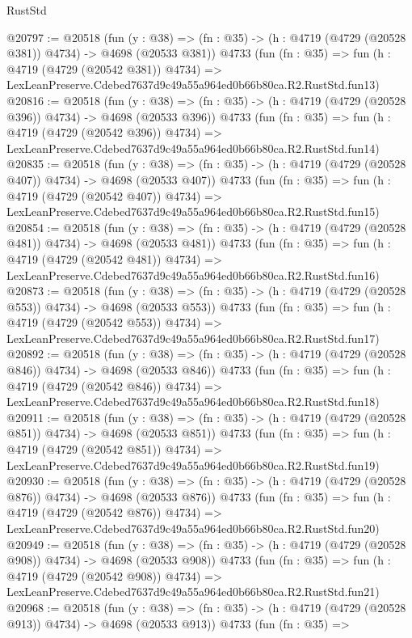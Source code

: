 \begin{lexlean}{RustStd}
\begin{coremodule}
@20797 := @20518
    (fun (y : @38) => (fn : @35) -> (h : @4719 (@4729 (@20528 @381)) @4734) -> @4698 (@20533 @381))
    @4733
    (fun (fn : @35) =>
    fun (h : @4719 (@4729 (@20542 @381)) @4734) =>
    LexLeanPreserve.Cdebed7637d9c49a55a964ed0b66b80ca.R2.RustStd.fun13)
@20816 := @20518
    (fun (y : @38) => (fn : @35) -> (h : @4719 (@4729 (@20528 @396)) @4734) -> @4698 (@20533 @396))
    @4733
    (fun (fn : @35) =>
    fun (h : @4719 (@4729 (@20542 @396)) @4734) =>
    LexLeanPreserve.Cdebed7637d9c49a55a964ed0b66b80ca.R2.RustStd.fun14)
@20835 := @20518
    (fun (y : @38) => (fn : @35) -> (h : @4719 (@4729 (@20528 @407)) @4734) -> @4698 (@20533 @407))
    @4733
    (fun (fn : @35) =>
    fun (h : @4719 (@4729 (@20542 @407)) @4734) =>
    LexLeanPreserve.Cdebed7637d9c49a55a964ed0b66b80ca.R2.RustStd.fun15)
@20854 := @20518
    (fun (y : @38) => (fn : @35) -> (h : @4719 (@4729 (@20528 @481)) @4734) -> @4698 (@20533 @481))
    @4733
    (fun (fn : @35) =>
    fun (h : @4719 (@4729 (@20542 @481)) @4734) =>
    LexLeanPreserve.Cdebed7637d9c49a55a964ed0b66b80ca.R2.RustStd.fun16)
@20873 := @20518
    (fun (y : @38) => (fn : @35) -> (h : @4719 (@4729 (@20528 @553)) @4734) -> @4698 (@20533 @553))
    @4733
    (fun (fn : @35) =>
    fun (h : @4719 (@4729 (@20542 @553)) @4734) =>
    LexLeanPreserve.Cdebed7637d9c49a55a964ed0b66b80ca.R2.RustStd.fun17)
@20892 := @20518
    (fun (y : @38) => (fn : @35) -> (h : @4719 (@4729 (@20528 @846)) @4734) -> @4698 (@20533 @846))
    @4733
    (fun (fn : @35) =>
    fun (h : @4719 (@4729 (@20542 @846)) @4734) =>
    LexLeanPreserve.Cdebed7637d9c49a55a964ed0b66b80ca.R2.RustStd.fun18)
@20911 := @20518
    (fun (y : @38) => (fn : @35) -> (h : @4719 (@4729 (@20528 @851)) @4734) -> @4698 (@20533 @851))
    @4733
    (fun (fn : @35) =>
    fun (h : @4719 (@4729 (@20542 @851)) @4734) =>
    LexLeanPreserve.Cdebed7637d9c49a55a964ed0b66b80ca.R2.RustStd.fun19)
@20930 := @20518
    (fun (y : @38) => (fn : @35) -> (h : @4719 (@4729 (@20528 @876)) @4734) -> @4698 (@20533 @876))
    @4733
    (fun (fn : @35) =>
    fun (h : @4719 (@4729 (@20542 @876)) @4734) =>
    LexLeanPreserve.Cdebed7637d9c49a55a964ed0b66b80ca.R2.RustStd.fun20)
@20949 := @20518
    (fun (y : @38) => (fn : @35) -> (h : @4719 (@4729 (@20528 @908)) @4734) -> @4698 (@20533 @908))
    @4733
    (fun (fn : @35) =>
    fun (h : @4719 (@4729 (@20542 @908)) @4734) =>
    LexLeanPreserve.Cdebed7637d9c49a55a964ed0b66b80ca.R2.RustStd.fun21)
@20968 := @20518
    (fun (y : @38) => (fn : @35) -> (h : @4719 (@4729 (@20528 @913)) @4734) -> @4698 (@20533 @913))
    @4733
    (fun (fn : @35) =>

\end{coremodule}
\end{lexlean}

